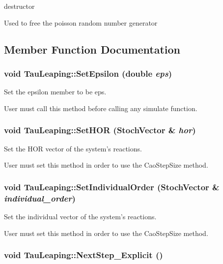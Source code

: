 destructor 

Used to free the poisson random number generator 

\subsection{Member Function Documentation}
\hypertarget{class_tau_leaping_a91ab3cda9053416a602abab6e5ac2a8}{
\subsubsection{\setlength{\rightskip}{0pt plus 5cm}void TauLeaping::SetEpsilon (double {\em eps})}}
\label{class_tau_leaping_a91ab3cda9053416a602abab6e5ac2a8}


Set the epsilon member to be eps. 

User must call this method before calling any simulate function. \hypertarget{class_tau_leaping_9b2d7a3f01522e9b5ca70702a55d1028}{
\subsubsection{\setlength{\rightskip}{0pt plus 5cm}void TauLeaping::SetHOR ({\bf StochVector} \& {\em hor})}}
\label{class_tau_leaping_9b2d7a3f01522e9b5ca70702a55d1028}


Set the HOR vector of the system's reactions. 

User must set this method in order to use the CaoStepSize method. \hypertarget{class_tau_leaping_b5328d24346442c748a96158976a2c7f}{
\subsubsection{\setlength{\rightskip}{0pt plus 5cm}void TauLeaping::SetIndividualOrder ({\bf StochVector} \& {\em individual\_\-order})}}
\label{class_tau_leaping_b5328d24346442c748a96158976a2c7f}


Set the individual vector of the system's reactions. 

User must set this method in order to use the CaoStepSize method. \hypertarget{class_tau_leaping_1f930cd36e11f38a0e134850682a78e5}{
\subsubsection{\setlength{\rightskip}{0pt plus 5cm}void TauLeaping::NextStep\_\-Explicit ()}}
\label{class_tau_leaping_1f930cd36e11f38a0e134850682a78e5}


